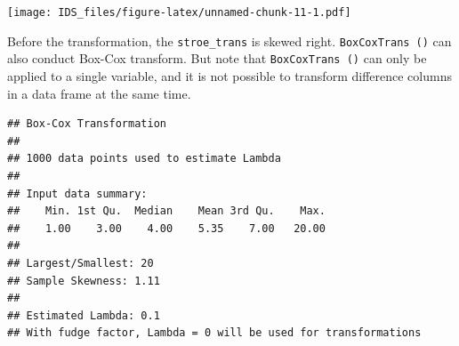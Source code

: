 \documentclass[12pt,]{krantz}
\makeatletter
\newenvironment{Shaded}{\begin{snugshade}}{\end{snugshade}}
\newcommand{\DataTypeTok}[1]{\textcolor[rgb]{0.27,0.27,0.27}{#1}}
\newcommand{\DecValTok}[1]{\textcolor[rgb]{0.06,0.06,0.06}{#1}}
\newcommand{\KeywordTok}[1]{\textcolor[rgb]{0.27,0.27,0.27}{\textbf{#1}}}
\newcommand{\NormalTok}[1]{#1}
\newcommand{\OperatorTok}[1]{\textcolor[rgb]{0.43,0.43,0.43}{\textbf{#1}}}
\newcommand{\StringTok}[1]{\textcolor[rgb]{0.5,0.5,0.5}{#1}}
\newenvironment{kframe}{%
\medskip{}
\setlength{\fboxsep}{.8em}
 \def\at@end@of@kframe{}%
 \ifinner\ifhmode%
  \def\at@end@of@kframe{\end{minipage}}%
  \begin{minipage}{\columnwidth}%
 \fi\fi%
 \def\FrameCommand##1{\hskip\@totalleftmargin \hskip-\fboxsep
 \colorbox{shadecolor}{##1}\hskip-\fboxsep
     \hskip-\linewidth \hskip-\@totalleftmargin \hskip\columnwidth}%
 \MakeFramed {\advance\hsize-\width
   \@totalleftmargin\z@ \linewidth\hsize
   \@setminipage}}%
 {\par\unskip\endMakeFramed%
 \at@end@of@kframe}
\renewenvironment{Shaded}{\begin{kframe}}{\end{kframe}}
\makeatother
\begin{document}
\begin{Shaded}
\end{Shaded}

\texttt{[image: IDS\_files/figure-latex/unnamed-chunk-11-1.pdf]}

Before the transformation, the \texttt{stroe\_trans} is skewed right.
\texttt{BoxCoxTrans\ ()} can also conduct Box-Cox transform. But note that \texttt{BoxCoxTrans\ ()} can only be applied to a single variable, and it is not possible to transform difference columns in a data frame at the same time.

\begin{Shaded}
\end{Shaded}

\begin{verbatim}
## Box-Cox Transformation
## 
## 1000 data points used to estimate Lambda
## 
## Input data summary:
##    Min. 1st Qu.  Median    Mean 3rd Qu.    Max. 
##    1.00    3.00    4.00    5.35    7.00   20.00 
## 
## Largest/Smallest: 20 
## Sample Skewness: 1.11 
## 
## Estimated Lambda: 0.1 
## With fudge factor, Lambda = 0 will be used for transformations
\end{verbatim}

\begin{Shaded}
\end{Shaded}
\end{document}
